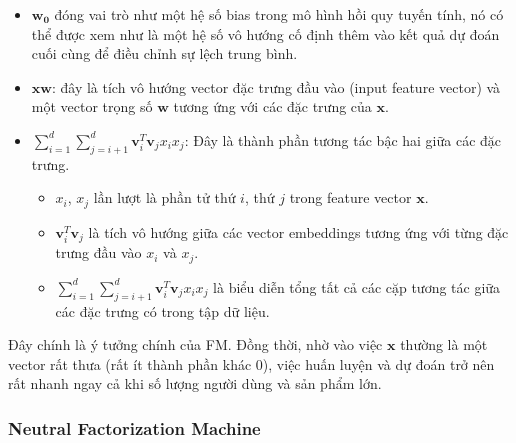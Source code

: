 \begin{itemize}
    \item $\mathbf{w_0}$ đóng vai trò như một hệ số bias trong mô hình hồi quy tuyến tính, 
    nó có thể được xem như là một hệ số vô hướng cố định thêm vào kết quả dự đoán cuối cùng để điều chỉnh sự lệch trung bình.
    \item $\mathbf{xw}$: đây là tích vô hướng vector đặc trưng đầu vào (input feature vector) 
    và một vector trọng số $\mathbf{w}$ tương ứng với các đặc trưng của $\mathbf{x}$.
    \item $\sum_{i=1}^{d}\sum_{j=i+1}^{d} \mathbf{v}_i^T\mathbf{v}_jx_ix_j$: Đây là thành phần tương tác bậc hai giữa các đặc trưng.
    \begin{itemize}
        \item $x_i$, $x_j$ lần lượt là phần tử thứ $i$, thứ $j$ trong feature vector $\mathbf{x}$.
        \item $\mathbf{v}_i^T\mathbf{v}_j$ là tích vô hướng giữa các vector embeddings tương ứng với từng đặc trưng đầu vào $x_i$ và $x_j$.
        \item $\sum_{i=1}^{d}\sum_{j=i+1}^{d} \mathbf{v}_i^T\mathbf{v}_jx_ix_j$ là biểu diễn tổng tất cả các cặp tương tác giữa các đặc trưng có trong tập dữ liệu.    
    \end{itemize}
\end{itemize}

Đây chính là ý tưởng chính của FM. Đồng thời, nhờ vào việc $\mathbf{x}$ thường là một vector rất thưa (rất ít thành phần khác 0), 
việc huấn luyện và dự đoán trở nên rất nhanh ngay cả khi số lượng người dùng và sản phẩm lớn.

\subsubsection{Neutral Factorization Machine}
